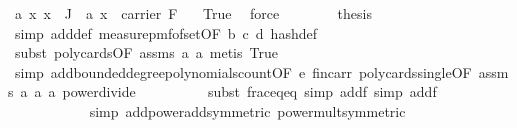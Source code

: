\begin{isabellebody}
\ a{\isacharunderscore}{\kern0pt}{}{\isacharcolon}{\kern0pt}\ {\isachardoublequoteopen}{\isasymAnd}x{\isachardot}{\kern0pt}\ x\ {\isasymin}\ J{\isacharprime}{\kern0pt}\ {\isasymLongrightarrow}\ a\ x\ {\isasymin}\ carrier\ F{\isachardoublequoteclose}\ \ \isamarkupfalse%
\ True\ \isamarkupfalse%
\ force\isanewline
\ \ \ \ \ \ \isamarkupfalse%
\ {\isacharquery}{\kern0pt}thesis\ \isanewline
\ \ \ \ \ \ \ \isamarkupfalse%
\ {\isacharparenleft}{\kern0pt}simp\ add{\isacharcolon}{\kern0pt}{\isasymOmega}{\isacharunderscore}{\kern0pt}def\ measure{\isacharunderscore}{\kern0pt}pmf{\isacharunderscore}{\kern0pt}of{\isacharunderscore}{\kern0pt}set{\isacharbrackleft}{\kern0pt}OF\ b\ c{\isacharbrackright}{\kern0pt}\ d\ hash{\isacharunderscore}{\kern0pt}def{\isacharparenright}{\kern0pt}\isanewline
\ \ \ \ \ \ \ \isamarkupfalse%
\ {\isacharparenleft}{\kern0pt}subst\ poly{\isacharunderscore}{\kern0pt}cards{\isacharbrackleft}{\kern0pt}OF\ assms{\isacharparenleft}{\kern0pt}{}{\isacharparenright}{\kern0pt}\ a{\isacharunderscore}{\kern0pt}{}\ a{\isacharunderscore}{\kern0pt}{}{\isacharbrackright}{\kern0pt}{\isacharcomma}{\kern0pt}\ metis\ True{\isacharparenright}{\kern0pt}\isanewline
\ \ \ \ \ \ \ \ \isamarkupfalse%
\ {\isacharparenleft}{\kern0pt}simp\ add{\isacharcolon}{\kern0pt}bounded{\isacharunderscore}{\kern0pt}degree{\isacharunderscore}{\kern0pt}polynomials{\isacharunderscore}{\kern0pt}count{\isacharbrackleft}{\kern0pt}OF\ e\ fin{\isacharunderscore}{\kern0pt}carr{\isacharbrackright}{\kern0pt}\ poly{\isacharunderscore}{\kern0pt}cards{\isacharunderscore}{\kern0pt}single{\isacharbrackleft}{\kern0pt}OF\ assms{\isacharparenleft}{\kern0pt}{}{\isacharparenright}{\kern0pt}\ a{\isacharunderscore}{\kern0pt}{}\ a{\isacharunderscore}{\kern0pt}{}\ a{\isacharunderscore}{\kern0pt}{}{\isacharbrackright}{\kern0pt}\ power{\isacharunderscore}{\kern0pt}divide{\isacharparenright}{\kern0pt}\isanewline
\ \ \ \ \ \ \ \ \isamarkupfalse%
\ {\isacharparenleft}{\kern0pt}subst\ frac{\isacharunderscore}{\kern0pt}eq{\isacharunderscore}{\kern0pt}eq{\isacharcomma}{\kern0pt}\ simp\ add{\isacharcolon}{\kern0pt}f{\isacharcomma}{\kern0pt}\ simp\ add{\isacharcolon}{\kern0pt}f{\isacharparenright}{\kern0pt}\ \isanewline
\ \ \ \ \ \ \ \ \ \ \isamarkupfalse%
\ {\isacharparenleft}{\kern0pt}simp\ add{\isacharcolon}{\kern0pt}power{\isacharunderscore}{\kern0pt}add{\isacharbrackleft}{\kern0pt}symmetric{\isacharbrackright}{\kern0pt}\ power{\isacharunderscore}{\kern0pt}mult{\isacharbrackleft}{\kern0pt}symmetric{\isacharbrackright}{\kern0pt}{\isacharparenright}{\kern0pt}\isanewline

\end{isabellebody}
